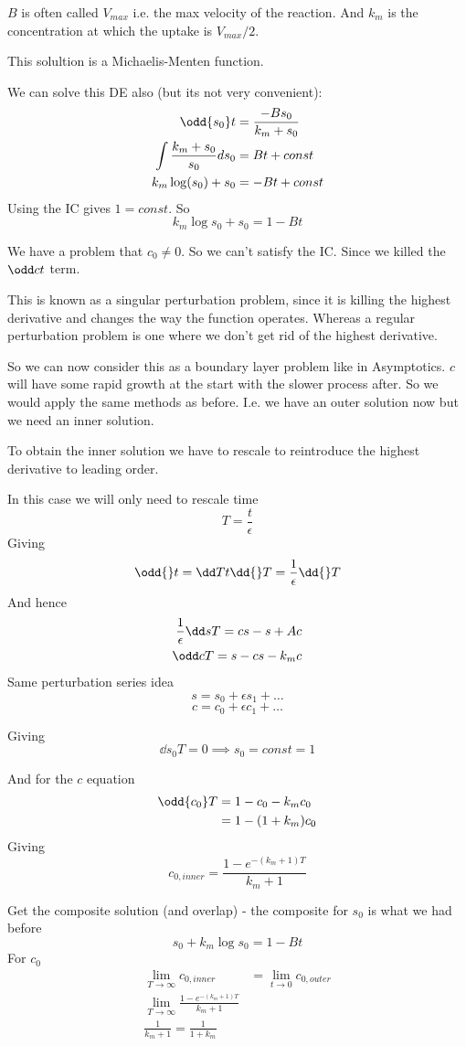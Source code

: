 \documentclass{X:/Documents/Coding/Latex/myassignment}
\begin{document}
$B$ is often called $V_{max}$ i.e. the max velocity of the reaction. And $k_m$ is the concentration at which the uptake is $V_{max}/2$.

This solultion is a Michaelis-Menten function.

We can solve this DE also (but its not very convenient):
\begin{align*}
	\odd{s_0}t &= \frac{-Bs_0}{k_m + s_0}\\
	\int \frac{k_m+s_0}{s_0} ds_0 &= Bt + const\\
	k_m \log(s_0) + s_0 &= -Bt + const\\
\end{align*}
Using the IC gives $1 = const$. So
\[k_m\log s_0 + s_0 = 1- Bt\]

We have a problem that $c_0 \neq 0$. So we can't satisfy the IC. Since we killed the $\odd ct$ term.

This is known as a singular perturbation problem, since it is killing the highest derivative and changes the way the function operates. Whereas a regular perturbation problem is one where we don't get rid of the highest derivative.

So we can now consider this as a boundary layer problem like in Asymptotics.
$c$ will have some rapid growth at the start with the slower process after. So we would apply the same methods as before. I.e. we have an outer solution now but we need an inner solution.

To obtain the inner solution we have to rescale to reintroduce the highest derivative to leading order.

In this case we will only need to rescale time
\[T = \frac{t}{\epsilon}\]
Giving
\[\odd{}t = \dd Tt\dd{}T = \frac{1}{\epsilon} \dd{}T\]
And hence
\begin{align*}
	\frac1 \epsilon \dd sT = cs -s + Ac\\
	\odd cT = s - cs - k_m c
\end{align*}
Same perturbation series idea
\[s = s_0 + \epsilon s_1 + \ldots\]
\[c = c_0 + \epsilon c_1 + \ldots\]

Giving
\[\dd{s_0}T = 0 \implies s_0 = const = 1\]

And for the $c$ equation
\begin{align*}
	\odd{c_0}T &= 1 - c_0 - k_m c_0\\
	&= 1 - (1+k_m)c_0
\end{align*}
Giving
\[c_{0,inner} = \frac{1-e^{-\left(k_m+1\right)T}}{k_m+1}\]

Get the composite solution (and overlap) - the composite for $s_0$ is what we had before
\[s_0 + k_m \log s_0 = 1 - Bt\]
For $c_0$
\begin{align*}
	\lim_{T\to \infty} c_{0,inner} &= \lim_{t \to 0} c_{0,outer} \\
	\lim_{T\to \infty} \frac{1-e^{-\left(k_m+1\right)T}}{k_m+1} \\
	\frac{1}{k_m+1} = \frac{1}{1+k_m}\\
\end{align*}
\end{document}
